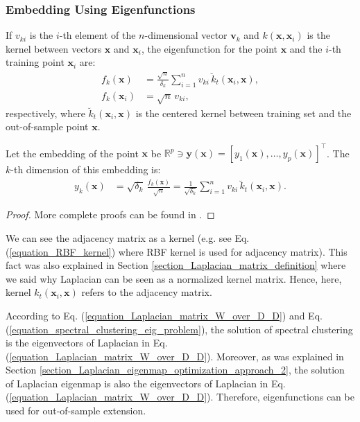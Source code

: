 \documentclass[lang=cn,10pt]{gorgeousnbook}
\numberwithin{equation}{section}%
\numberwithin{figure}{section}%
\begin{document}
\subsubsection{Embedding Using Eigenfunctions}

\begin{proposition}
If $v_{ki}$ is the $i$-th element of the $n$-dimensional vector $\boldsymbol{v}_k$ and $k(\boldsymbol{x}, \boldsymbol{x}_i)$ is the kernel between vectors $\boldsymbol{x}$ and $\boldsymbol{x}_i$, the eigenfunction for the point $\boldsymbol{x}$ and the $i$-th training point $\boldsymbol{x}_i$ are:
\begin{align}
f_k(\boldsymbol{x}) &= \frac{\sqrt{n}}{\delta_k} \sum_{i=1}^n v_{ki}\, \breve{k}_t(\boldsymbol{x}_i, \boldsymbol{x}), \\
f_k(\boldsymbol{x}_i) &= \sqrt{n}\, v_{ki}, 
\end{align}
respectively, where $\breve{k}_t(\boldsymbol{x}_i, \boldsymbol{x})$ is the centered kernel between training set and the out-of-sample point $\boldsymbol{x}$. 

Let the embedding of the point $\boldsymbol{x}$ be $\mathbb{R}^p \ni \boldsymbol{y}(\boldsymbol{x}) = [y_1(\boldsymbol{x}), \dots, y_p(\boldsymbol{x})]^\top$. The $k$-th dimension of this embedding is:
\begin{align}\label{equation_embedding_eigenfunction}
y_k(\boldsymbol{x}) &= \sqrt{\delta_k}\, \frac{f_k(\boldsymbol{x})}{\sqrt{n}} = \frac{1}{\sqrt{\delta_k}} \sum_{i=1}^n v_{ki}\, \breve{k}_t(\boldsymbol{x}_i, \boldsymbol{x}).
\end{align}
\end{proposition}

\begin{proof}
More complete proofs can be found in \cite{bengio2003learning}. 
\end{proof}

We can see the adjacency matrix as a kernel (e.g. see Eq. (\ref{equation_RBF_kernel}) where RBF kernel is used for adjacency matrix). This fact was also explained in Section \ref{section_Laplacian_matrix_definition} where we said why Laplacian can be seen as a normalized kernel matrix. Hence, here, kernel $k_t(\boldsymbol{x}_i, \boldsymbol{x})$ refers to the adjacency matrix. 

According to Eq. (\ref{equation_Laplacian_matrix_W_over_D_D}) and Eq. (\ref{equation_spectral_clustering_eig_problem}), the solution of spectral clustering is the eigenvectors of Laplacian in Eq. (\ref{equation_Laplacian_matrix_W_over_D_D}). Moreover, as was explained in Section \ref{section_Laplacian_eigenmap_optimization_approach_2}, the solution of Laplacian eigenmap is also the eigenvectors of Laplacian in Eq. (\ref{equation_Laplacian_matrix_W_over_D_D}). Therefore, eigenfunctions can be used for out-of-sample extension. 
\end{document}
